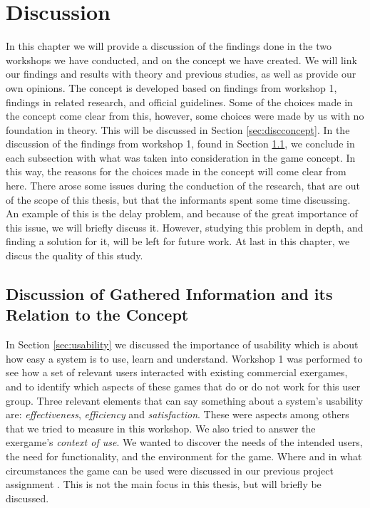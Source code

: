 \chapter{Discussion}
\label{chap:discussion}

In this chapter we will provide a discussion of the findings done in the two workshops we have conducted, and on the concept we have created. We will link our findings and results with theory and previous studies, as well as provide our own opinions. The concept is developed based on findings from workshop 1, findings in related research, and official guidelines. Some of the choices made in the concept come clear from this, however, some choices were made by us with no foundation in theory. This will be discussed in Section \ref{sec:discconcept}. In the discussion of the findings from workshop 1, found in Section \ref{sec:discfindings1}, we conclude in each subsection with what was taken into consideration in the game concept. In this way, the reasons for the choices made in the concept will come clear from here. There arose some issues during the conduction of the research, that are out of the scope of this thesis, but that the informants spent some time discussing. An example of this is the delay problem, and because of the great importance of this issue, we will briefly discuss it. However, studying this problem in depth, and finding a solution for it, will be left for future work. At last in this chapter, we discus the quality of this study.

\section{Discussion of Gathered Information and its Relation to the Concept}
\label{sec:discfindings1}

In Section \ref{sec:usability} we discussed the importance of usability which is about how easy a system is to use, learn and understand. Workshop 1 was performed to see how a set of relevant users interacted with existing commercial exergames, and to identify which aspects of these games that do or do not work for this user group. Three relevant elements that can say something about a system's usability are: \emph{effectiveness}, \emph{efficiency}  and \emph{satisfaction}. These were aspects among others that we tried to measure in this workshop. We also tried to answer the exergame's \emph{context of use}. We wanted to discover the needs of the intended users, the need for functionality, and the environment for the game. Where and in what circumstances the game can be used were discussed in our previous project assignment \cite{project}. This is not the main focus in this thesis, but will briefly be discussed.

